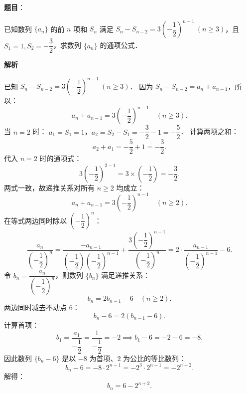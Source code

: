 \begin{answer}


\end{answer}
\begin{answer}

\textbf{题目}：

已知数列 $\{a_n\}$ 的前 $n$ 项和 $S_n$ 满足 $S_n - S_{n-2} = 3\left(-\dfrac{1}{2}\right)^{n-1}\ (n \geqslant 3)$，且 $S_1 = 1, S_2 = -\dfrac{3}{2}$，求数列 $\{a_n\}$ 的通项公式．

\textbf{解析}

已知 $S_n - S_{n-2} = 3\left(-\dfrac{1}{2}\right)^{n-1}\ (n \geqslant 3)$．
因为 $S_n - S_{n-2} = a_n + a_{n-1}$，所以：
\nopagebreak[4]
\[
a_n + a_{n-1} = 3\left(-\dfrac{1}{2}\right)^{n-1} \quad (n \geqslant 3).
\]
当 $n = 2$ 时：
$a_1 = S_1 = 1$，$a_2 = S_2 - S_1 = -\dfrac{3}{2} - 1 = -\dfrac{5}{2}$．
计算两项之和：
\nopagebreak[4]
\[
a_2 + a_1 = -\dfrac{5}{2} + 1 = -\dfrac{3}{2}.
\]
代入 $n = 2$ 时的通项式：
\nopagebreak[4]
\[
3\left(-\dfrac{1}{2}\right)^{2-1} = 3 \times \left(-\dfrac{1}{2}\right) = -\dfrac{3}{2}.
\]
两式一致，故递推关系对所有 $n \geqslant 2$ 均成立：
\nopagebreak[4]
\[
a_n + a_{n-1} = 3\left(-\dfrac{1}{2}\right)^{n-1} \quad (n \geqslant 2).
\]
在等式两边同时除以 $\left(-\dfrac{1}{2}\right)^n$：
\nopagebreak[4]
\[
\dfrac{a_n}{\left(-\dfrac{1}{2}\right)^n} = \dfrac{-a_{n-1}}{\left(-\dfrac{1}{2}\right)\left(-\dfrac{1}{2}\right)^{n-1}} + \dfrac{3\left(-\dfrac{1}{2}\right)^{n-1}}{\left(-\dfrac{1}{2}\right)^n} = 2 \cdot \dfrac{a_{n-1}}{\left(-\dfrac{1}{2}\right)^{n-1}} - 6.
\]
令 $b_n = \dfrac{a_n}{\left(-\dfrac{1}{2}\right)^n}$，则数列 $\{b_n\}$ 满足递推关系：
\nopagebreak[4]
\[
b_n = 2b_{n-1} - 6 \quad (n \geqslant 2).
\]
两边同时减去不动点 $6$：
\nopagebreak[4]
\[
b_n - 6 = 2(b_{n-1} - 6).
\]
计算首项：
\nopagebreak[4]
\[
b_1 = \dfrac{a_1}{-\dfrac{1}{2}} = \dfrac{1}{-\dfrac{1}{2}} = -2 \implies b_1 - 6 = -2 - 6 = -8.
\]
因此数列 $\{b_n - 6\}$ 是以 $-8$ 为首项、$2$ 为公比的等比数列：
\nopagebreak[4]
\[
b_n - 6 = -8 \cdot 2^{n-1} = -2^3 \cdot 2^{n-1} = -2^{n+2}.
\]
解得：
\nopagebreak[4]
\[
b_n = 6 - 2^{n+2}.
\]

\end{answer}
